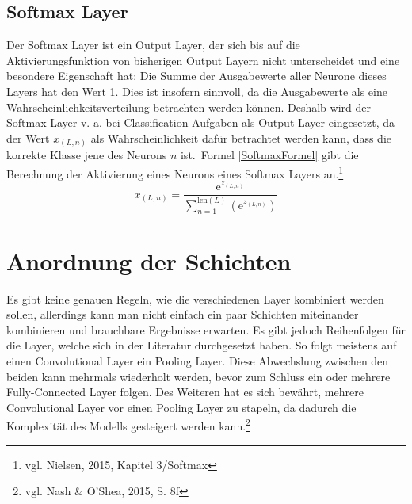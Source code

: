 \documentclass[
	a4paper,
	12pt,
	ngerman,
	oneside
]{scrreprt}											%
\newcommand{\cnnKlein}[1]{vgl. Nash \& O'Shea, 2015, S. {#1}}
\begin{document}
			\subsection{Softmax Layer}
				Der Softmax Layer ist ein Output Layer, der sich bis auf die Aktivierungsfunktion von bisherigen Output Layern nicht unterscheidet und eine besondere Eigenschaft hat: Die Summe der Ausgabewerte aller Neurone dieses Layers hat den Wert 1. Dies ist insofern sinnvoll, da die Ausgabewerte als eine Wahrscheinlichkeitsverteilung betrachten werden können. Deshalb wird der Softmax Layer v. a. bei Classification-Aufgaben als Output Layer eingesetzt, da der Wert $x_{(L,n)}$ als Wahrscheinlichkeit dafür betrachtet werden kann, dass die korrekte Klasse jene des Neurons $n$ ist.~Formel \ref{SoftmaxFormel} gibt die Berechnung der Aktivierung eines Neurons eines Softmax Layers an.\footnote{vgl. Nielsen, 2015, Kapitel 3/Softmax}
				\vspace*{-0.3cm}
				\begin{equation}\label{SoftmaxFormel}
					x_{(L,n)} = \frac{ \textrm{e}^{ z_{(L,n)} } }{ \sum\limits_{ n=1 }^{ \textrm{len}(L) } \left( \textrm{e}^{ z_{ (L,n) } } \right)} 
				\end{equation}
				
		\section{Anordnung der Schichten}
			Es gibt keine genauen Regeln, wie die verschiedenen Layer kombiniert werden sollen, allerdings kann man nicht einfach ein paar Schichten miteinander kombinieren und brauchbare Ergebnisse erwarten. Es gibt jedoch Reihenfolgen für die Layer, welche sich in der Literatur durchgesetzt haben. So folgt meistens auf einen Convolutional Layer ein Pooling Layer. Diese Abwechslung zwischen den beiden kann mehrmals wiederholt werden, bevor zum Schluss ein oder mehrere Fully-Connected Layer folgen. Des Weiteren hat es sich bewährt, mehrere Convolutional Layer vor einen Pooling Layer zu stapeln, da dadurch die Komplexität des Modells gesteigert werden kann.\footnote{\cnnKlein{8f}}
\end{document}
